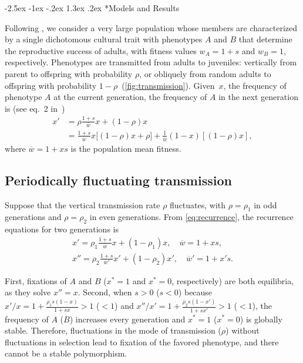 \documentclass[14pt]{extarticle}
\makeatletter
\renewcommand\section{\@startsection {section}{1}{\z@}%
     {-2.5ex \@plus -1ex \@minus -.2ex}%
     {1.3ex \@plus.2ex}%
    {\Large\bfseries}}
\makeatother
\begin{document}
\section*{Models and Results}

Following \citet{Ram2018}, we consider a very large population whose members are characterized by a single dichotomous cultural trait with phenotypes $A$ and $B$ that determine the reproductive success of adults, with fitness values $w_A=1+s$ and $w_B=1$, respectively.
Phenotypes are transmitted from adults to juveniles: vertically from parent to offspring with probability $\rho$, or obliquely from random adults to offspring with probability $1-\rho$~(\autoref{fig:transmission}).
Given~$x$, the frequency of phenotype $A$ at the current generation, the frequency of $A$ in the next generation is (see eq.~2 in~\citet{Ram2018})
\begin{equation}\begin{aligned} \label{eq:recurrence}
x' &= \rho \frac{1+s}{\overline w} x + (1-\rho)x \\
&= \frac{1+s}{\overline w} x \big[(1-\rho)x + \rho\big] + \frac{1}{\overline w} (1-x) [(1-\rho)x],
\end{aligned}\end{equation}
where $\overline w = 1 + xs$ is the population mean fitness.

\subsection*{Periodically fluctuating transmission}

Suppose that the vertical transmission rate $\rho$ fluctuates, with $\rho = \rho_1$ in odd generations and $\rho = \rho_2$ in even generations.
From \eqref{eq:recurrence}, the recurrence equations for two generations is
\begin{equation}\begin{aligned} \label{eq:recurrence_two_generations}
x' = \rho_1 \frac{1+s}{\overline w} x + (1-\rho_1)x, \quad \overline w = 1 + xs, \\
x'' = \rho_2 \frac{1+s}{\overline w'} x' + (1-\rho_2)x', \quad \overline w' = 1 + x's.
\end{aligned}\end{equation}

First, fixations of $A$ and $B$ ($x^*=1$ and $x^*=0$, respectively) are both equilibria, as they solve $x''=x$.
Second, when $s>0$ ($s<0$) because $x'/x = 1+\frac{\rho_1 s (1-x)}{1+sx} > 1$ ($<1$) and $x''/x' = 1+\frac{\rho_2 s (1-x')}{1+sx'} > 1$ ($<1$), the frequency of $A$ ($B$) increases every generation and $x^*=1$ ($x^*=0$) is globally stable.
Therefore, fluctuations in the mode of transmission ($\rho$) without fluctuations in selection lead to fixation of the favored phenotype, and there cannot be a stable polymorphism.
\end{document}
